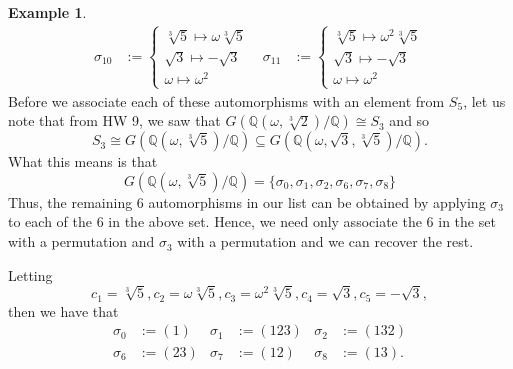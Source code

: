 \documentclass[leqno]{article}
\theoremstyle{definition}
\theoremstyle{remark}
\theoremstyle{definition}
\newtheorem{example}{Example}
\begin{document}
\begin{example}
\begin{align*}
\sigma_{10}&:=\begin{cases}\sqrt[3]{5}\mapsto\omega\sqrt[3]{5}\\\sqrt{3}\mapsto-\sqrt{3}\\\omega\mapsto\omega^2 \end{cases} & \sigma_{11}&:=\begin{cases} \sqrt[3]{5}\mapsto\omega^2\sqrt[3]{5} \\\sqrt{3}\mapsto-\sqrt{3}\\\omega\mapsto\omega^2\end{cases}
                            \end{align*}
                        Before we associate each of these automorphisms with an element from $S_{5}$, let us note that from HW 9, we saw that $G(\mathbb{Q}(\omega,\sqrt[3]{2})/\mathbb{Q})\cong S_3$
                        and so 
                            \begin{equation*}
                                S_3\cong G(\mathbb{Q}(\omega,\sqrt[3]{5})/\mathbb{Q})\subseteq G(\mathbb{Q}(\omega,\sqrt{3},\sqrt[3]{5})/\mathbb{Q}).
                            \end{equation*}
                        What this means is that
                            \begin{equation*}
                                G(\mathbb{Q}(\omega,\sqrt[3]{5})/\mathbb{Q})=\{\sigma_0,\sigma_1,\sigma_2,\sigma_6,\sigma_7,\sigma_8\}
                            \end{equation*}
                        Thus, the remaining 6 automorphisms in our list can be obtained by applying $\sigma_3$ to each of the 6 in the above set. Hence, we need only associate the 6 in the set with a permutation and $\sigma_3$ with a permutation and we can recover the rest.\par\hspace{4mm} Letting
                            \begin{equation*}
                                c_1=\sqrt[3]{5},c_2=\omega\sqrt[3]{5},c_3=\omega^2\sqrt[3]{5},c_4=\sqrt{3},c_5=-\sqrt{3},
                            \end{equation*}
                        then we have that 
                            \begin{align*}
                                \sigma_0&:=(1) & \sigma_1&:=(123) & \sigma_2&:=(132) \\
                                \sigma_6&:=(23) & \sigma_7&:=(12) & \sigma_8&:=(13).
                            \end{align*}

\end{example}
\end{document}
